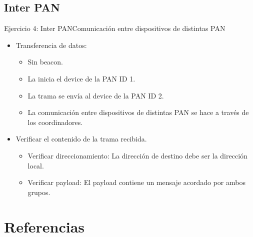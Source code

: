 \documentclass[aspectratio=169]{beamer}
\begin{document}
\subsection[Inter PAN]{Inter PAN}
\begin{frame}[t]{Ejercicio 4: Inter PAN}{Comunicación entre dispositivos de distintas PAN}
    \begin{itemize}
        \item Transferencia de datos:
            \begin{itemize}
            \item Sin beacon.
            \vspace{5px}
            \item La inicia el device de la PAN ID 1.
            \vspace{5px}   
            \item La trama se envía al device de la PAN ID 2.
            \vspace{5px}
            \item La comunicación entre dispositivos de distintas PAN se hace a través de los coordinadores.
            \vspace{5px}
            \end{itemize}
        \item Verificar el contenido de la trama recibida.
        \vspace{5px}
            \begin{itemize}
            \item Verificar direccionamiento: La dirección de destino debe ser la dirección local.
            \vspace{5px}
            \item Verificar payload: El payload contiene un mensaje acordado por ambos grupos.
            \vspace{5px}
            \end{itemize}
        \vspace{5px}
    \end{itemize}   
\end{frame}

\section{Referencias}
\end{document}
